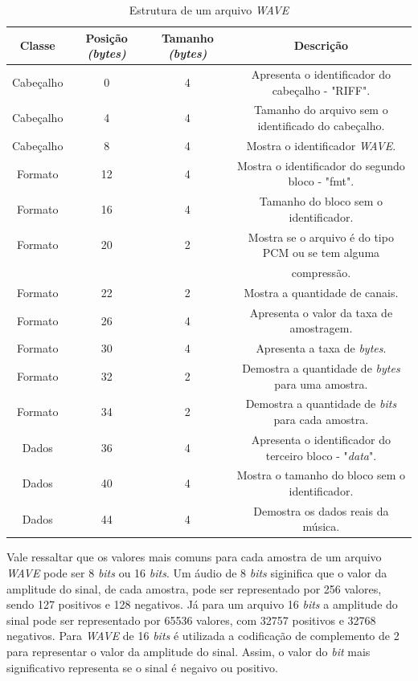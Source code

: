 \documentclass[a4paper,12pt,twoside,openright]{report}
\begin{document}
\begin{table}[h] 
	\centering
	\caption{Estrutura de um arquivo \textit{WAVE}}
	\begin{tabular}{c|c|c|c}
		\textbf{Classe} & \textbf{Posi\c{c}\~{a}o \textit{(bytes)}} & \textbf{Tamanho \textit{(bytes)}} & \textbf{Descri\c{c}\~{a}o}\\
		\hline
		Cabe\c{c}alho & 0 & 4 & Apresenta o identificador do cabe\c{c}alho - "RIFF".\\
		Cabe\c{c}alho & 4 & 4 & Tamanho do arquivo sem o identificado do cabe\c{c}alho.\\
		Cabe\c{c}alho & 8 & 4 & Mostra o identificador \textit{WAVE}.\\
		\hline
		Formato & 12 & 4 & Mostra o identificador do segundo bloco - "fmt".\\
		Formato & 16 & 4 & Tamanho do bloco sem o identificador.\\
		Formato & 20 & 2 & Mostra se o arquivo \'{e} do tipo PCM ou se tem alguma \\ & & & compress\~{a}o.\\
		Formato & 22 & 2 & Mostra a quantidade de canais.\\
		Formato & 26 & 4 & Apresenta o valor da taxa de amostragem.\\
		Formato & 30 & 4 & Apresenta a taxa de \textit{bytes}.\\
		Formato & 32 & 2 & Demostra a quantidade de \textit{bytes} para uma amostra.\\
		Formato & 34 & 2 & Demostra a quantidade de \textit{bits} para cada amostra.\\
		\hline
		Dados & 36 & 4 & Apresenta o identificador do terceiro bloco - "\textit{data}".\\
		Dados & 40 & 4 & Mostra o tamanho do bloco sem o identificador.\\
		Dados & 44 & 4 & Demostra os dados reais da m\'{u}sica.
		
	\end{tabular}
\end{table}  

\par Vale ressaltar que os valores mais comuns para cada amostra de um  arquivo \textit{WAVE} pode ser 8 \textit{bits} ou 16 \textit{bits}. Um \'{a}udio de 8 \textit{bits} siginifica que o valor da amplitude do sinal, de cada amostra, pode ser representado por 256 valores, sendo 127 positivos e 128 negativos. J\'{a} para um arquivo 16 \textit{bits} a amplitude do sinal pode ser representado por 65536 valores, com 32757 positivos e 32768 negativos. Para \textit{WAVE} de 16 \textit{bits} \'{e} utilizada a codifica{\c c}\~{a}o de complemento de 2 para representar o valor da amplitude do sinal. Assim, o valor do \textit{bit} mais significativo representa se o sinal \'{e} negaivo ou positivo.
\end{document}
